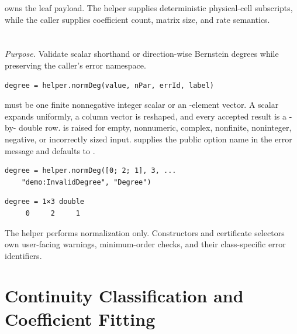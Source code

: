 \remarkshead
{} owns the leaf payload. The helper supplies deterministic physical-cell subscripts, while the caller supplies coefficient count, matrix size, and rate semantics.

\section{\texorpdfstring{}{helper.normDeg}}

\textit{Purpose.} Validate scalar shorthand or direction-wise Bernstein degrees while preserving the caller's error namespace.

\syntaxhead
\begin{lstlisting}[style=dpsyntax]
degree = helper.normDeg(value, nPar, errId, label)
\end{lstlisting}

\descriptionhead
{} must be one finite nonnegative integer scalar or an -element vector. A scalar expands uniformly, a column vector is reshaped, and every accepted result is a -by- double row.  is raised for empty, nonnumeric, complex, nonfinite, noninteger, negative, or incorrectly sized input.  supplies the public option name in the error message and defaults to .

\examplehead
\begin{lstlisting}[style=dpmatlab]
degree = helper.normDeg([0; 2; 1], 3, ...
    "demo:InvalidDegree", "Degree")
\end{lstlisting}
\begin{lstlisting}[style=dpoutput]
degree = 1×3 double
     0     2     1
\end{lstlisting}

\remarkshead
The helper performs normalization only. Constructors and certificate selectors own user-facing warnings, minimum-order checks, and their class-specific error identifiers.

\section{Continuity Classification and Coefficient Fitting}

\subsection{\texorpdfstring{}{helper.chkCont}}

